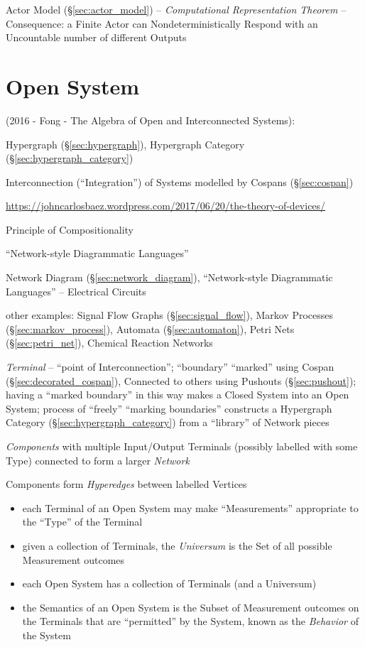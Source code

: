 
Actor Model (\S\ref{sec:actor_model}) -- \emph{Computational
  Representation Theorem} -- Consequence: a Finite Actor can
Nondeterministically Respond with an Uncountable number of different
Outputs %



\section{Open System}\label{sec:open_system}

(2016 - Fong - The Algebra of Open and Interconnected Systems):

\fist Hypergraph (\S\ref{sec:hypergraph}), Hypergraph Category
(\S\ref{sec:hypergraph_category})

Interconnection (``Integration'') of Systems modelled by Cospans
(\S\ref{sec:cospan})

\url{https://johncarlosbaez.wordpress.com/2017/06/20/the-theory-of-devices/}

Principle of Compositionality

``Network-style Diagrammatic Languages''

Network Diagram (\S\ref{sec:network_diagram}), ``Network-style
Diagrammatic Languages'' -- Electrical Circuits

other examples: Signal Flow Graphs (\S\ref{sec:signal_flow}),
Markov Processes (\S\ref{sec:markov_process}), Automata
(\S\ref{sec:automaton}), Petri Nets (\S\ref{sec:petri_net}), Chemical
Reaction Networks

\emph{Terminal} -- ``point of Interconnection''; ``boundary''
``marked'' using Cospan (\S\ref{sec:decorated_cospan}), Connected to
others using Pushouts (\S\ref{sec:pushout}); having a ``marked
boundary'' in this way makes a Closed System into an Open System;
process of ``freely''  ``marking boundaries'' constructs a Hypergraph
Category (\S\ref{sec:hypergraph_category}) from a ``library'' of
Network pieces

\emph{Components} with multiple Input/Output Terminals (possibly
labelled with some Type) connected to form a larger \emph{Network}

Components form \emph{Hyperedges} between labelled Vertices

\begin{itemize}
  \item each Terminal of an Open System may make ``Measurements''
    appropriate to the ``Type'' of the Terminal
  \item given a collection of Terminals, the \emph{Universum} is the
    Set of all possible Measurement outcomes
  \item each Open System has a collection of Terminals (and a Universum)
  \item the Semantics of an Open System is the Subset of Measurement
    outcomes on the Terminals that are ``permitted'' by the System,
    known as the \emph{Behavior} of the System
\end{itemize}

